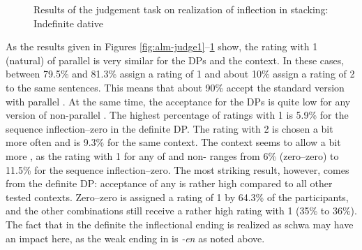 \documentclass[output=paper,colorlinks,citecolor=brown]{langscibook}
\begin{document}
\begin{figure}
\caption{Results of the judgement task on realization of inflection in stacking: Indefinite dative}
\label{fig:alm-judge4}
\end{figure}

As the results given in Figures \ref{fig:alm-judge1}--\ref{fig:alm-judge4} show, the rating with 1 (natural) of parallel  is very similar for the  DPs and the   context. In these cases, between 79.5\% and 81.3\% assign a rating of 1 and about 10\% assign a rating of 2 to the same sentences. This means that about 90\% accept the standard version with parallel . At the same time, the acceptance for the  DPs is quite low for any version of non-parallel . The highest percentage of ratings with 1 is 5.9\% for the sequence inflection--zero in the definite  DP. The rating with 2 is chosen a bit more often and is 9.3\% for the same context. The   context seems to allow a bit more , as the rating with 1 for any  of  and non- ranges from 6\% (zero--zero) to 11.5\% for the sequence inflection--zero. The most striking result, however, comes from the definite  DP: acceptance of any  is rather high compared to all other tested contexts. Zero--zero is assigned a rating of 1 by 64.3\% of the participants, and the other combinations still receive a rather high rating with 1 (35\% to 36\%). The fact that in the definite  the inflectional ending is realized as schwa may have an impact here, as the weak ending in  is \textit{-en} as noted above.
\end{document}
